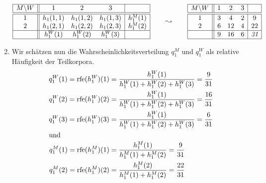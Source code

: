 \documentclass[ngerman, a4paper, 12pt]{article}
\DeclareMathOperator{\rfe}{rfe}
\begin{document}
\begin{enumerate}[label=\textbf{(\alph*)}, leftmargin=0pt]
 		\begin{equation*}
 		\begin{array}{|c||ccc|c|}
 		\hline
 		M \backslash W & 1 & 2 & 3 &\\ \hline \hline
 		1 & h_1(1,1) & h_1(1,2) & h_1(1,3) & h_1^M(1) \\
 		2 & h_1(2,1) & h_1(2,2) & h_1(2,3) & h_1^M(2) \\ \hline
 		& h_1^W(1) & h_1^W(2) & h_1^W(3) & \\ \hline
 		\end{array}
 		\qquad \leadsto \qquad 
 		\begin{array}{|c||ccc|c|}
 		\hline
 		M \backslash W & 1 & 2 & 3 &\\ \hline \hline
 		1 & 3 & 4 & 2 & 9 \\
 		2 & 6 & 12 & 4 & 22 \\ \hline
 		  & 9 & 16 & 6 & \textit{31} \\ \hline
 		\end{array}
 		\end{equation*}
 		\item Wir schätzen nun die Wahrscheinlichkeitsverteilung $q_1^M$ und $q_1^W$ als relative Häufigkeit der Teilkorpora.
 		\begin{align*}
 		q_1^W(1) = \rfe(h_1^W)(1) &= \frac{h_1^W(1)}{h_1^W(1) + h_1^W(2) + h_1^W(3)} = \frac{9}{31} \\
 		q_1^W(2) = \rfe(h_1^W)(2) &= \frac{h_1^W(1)}{h_1^W(1) + h_1^W(2) + h_1^W(3)} = \frac{16}{31} \\
 		q_1^W(3) = \rfe(h_1^W)(3) &= \frac{h_1^W(1)}{h_1^W(1) + h_1^W(2) + h_1^W(3)} = \frac{6}{31} \\
 		\intertext{und}
 		q_1^M(1) = \rfe(h_1^M)(1) &= \frac{h_1^M(1)}{h_1^M(1) + h_1^M(2)} = \frac{9}{31} \\
 		q_1^M(2) = \rfe(h_1^M)(2) &= \frac{h_1^M(2)}{h_1^M(1) + h_1^M(2)} = \frac{22}{31} \\
 		\end{align*}
	\end{enumerate}
\end{document}
